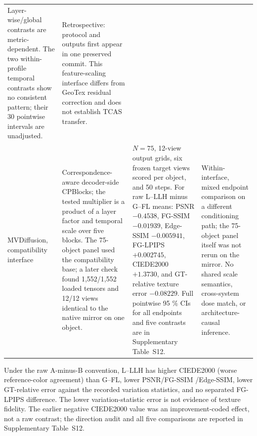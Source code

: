 \documentclass[times,twocolumn,final]{elsarticle}
\providecommand{\DIFadd}[1]{{\protect\color{blue} \sf #1}} %
\providecommand{\DIFaddbegin}{} %
\providecommand{\DIFaddend}{} %
\providecommand{\DIFaddFL}[1]{\DIFadd{#1}} %
\providecommand{\DIFaddbeginFL}{\DIFaddbegin} %
\providecommand{\DIFaddendFL}{\DIFaddend} %
\renewcommand{\DIFaddbeginFL}{}
\renewcommand{\DIFaddendFL}{}
\renewcommand{\DIFaddFL}[1]{#1}
\begin{document}
\begin{table}[t]
\begin{tabular}{p{2.4cm}p{4.0cm}p{4.2cm}p{4.5cm}}
\DIFaddFL{Layer-wise/global contrasts are metric-dependent. The two within-profile temporal contrasts show no consistent pattern; their 30 pointwise intervals are unadjusted. }&
\DIFaddFL{Retrospective: protocol and outputs first appear in one preserved commit. This feature-scaling interface differs from GeoTex residual correction and does not establish TCAS transfer. }\\
\DIFaddFL{MVDiffusion, compatibility interface }&
\DIFaddFL{Correspondence-aware decoder-side CPBlocks; the tested multiplier is a product of a layer factor and temporal scale over five blocks. The 75-object panel used the compatibility base; a later check found 1,552/1,552 loaded tensors and 12/12 views identical to the native mirror on one object. }&
\DIFaddFL{$N=75$, 12-view output grids, six frozen target views scored per object, }\DIFaddendFL and   \DIFaddbeginFL \DIFaddFL{50 steps. For raw L--LLH minus G--FL means: PSNR $-0.4538$, FG-SSIM $-0.01939$, Edge-SSIM $-0.005941$, FG-LPIPS $+0.002745$, CIEDE2000 $+1.3730$, and GT-relative texture error $-0.08229$. Full pointwise }\DIFaddendFL 95  \DIFaddbeginFL \DIFaddFL{\% CIs for all endpoints and five contrasts are in Supplementary Table~S12. }&
\DIFaddFL{Within-interface, mixed endpoint comparison on a different conditioning path; the 75-object panel itself was not rerun on the mirror. No shared scale semantics, cross-system dose match, or architecture-causal inference. }\\
\bottomrule
\end{tabular}
\end{table}

\DIFadd{Under the raw A-minus-B convention, L--LLH has higher CIEDE2000 (worse reference-color agreement) than G--FL, lower PSNR/}\DIFaddend FG-SSIM 
 \DIFaddbegin \DIFadd{/Edge-SSIM, lower GT-relative error against the recorded variation statistics, and no separated FG-LPIPS difference. The lower variation-statistic error is not evidence of texture fidelity. The earlier negative CIEDE2000 value was an improvement-coded effect, not a raw contrast; the direction audit and all five comparisons are reported in Supplementary Table~S12.
}\DIFaddend 
\end{document}
